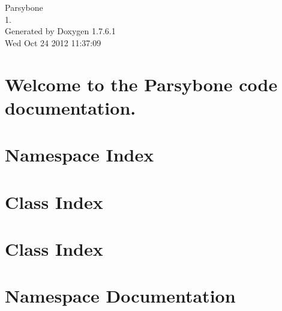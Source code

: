 \documentclass[a4paper]{book}
\begin{document}
\hypersetup{pageanchor=false,citecolor=blue}
\begin{titlepage}
\vspace*{7cm}
\begin{center}
{\Large \-Parsybone \\[1ex]\large 1. }\\
\vspace*{1cm}
{\large \-Generated by Doxygen 1.7.6.1}\\
\vspace*{0.5cm}
{\small Wed Oct 24 2012 11:37:09}\\
\end{center}
\end{titlepage}
\clearemptydoublepage
{}
\tableofcontents
\clearemptydoublepage
{}
\hypersetup{pageanchor=true,citecolor=blue}
\chapter{\-Welcome to the \-Parsybone code documentation.}
\label{index}\hypertarget{index}{}
\chapter{\-Namespace \-Index}

\chapter{\-Class \-Index}

\chapter{\-Class \-Index}

\chapter{\-Namespace \-Documentation}


\end{document}
